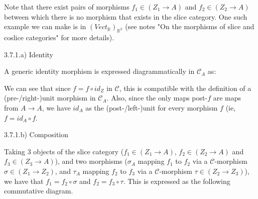 \documentclass[12pt, letterpaper, twoside]{report}
\begin{document}
Note that there exist pairs of morphisms $f_1 \in (Z_1 \to A)$ and $f_2 \in (Z_2 \to A)$ between which there is no morphism that exists in the slice category. One such example we can make is in $(Vect_\mathbb{R})_{\mathbb{R}^2}$ (see notes "On the morphisms of slice and coslice categories" for more details).

3.7.1.a) Identity

A generic identity morphism is expressed diagrammatically in $\mathcal{C}_A$ as:


We can see that since $f = f \circ id_Z$ in $\mathcal{C}$, this is compatible with the definition of a (pre-/right-)unit morphism in $\mathcal{C}_A$. Also, since the only maps post-$f$ are maps from $A \to A$, we have $id_A$ as the (post-/left-)unit for every morphism $f$ (ie, $f = id_A \circ f$. 

3.7.1.b) Composition

Taking 3 objects of the slice category ($f_1 \in (Z_1 \to A)$, $f_2 \in (Z_2 \to A)$ and $f_3 \in (Z_3 \to A)$), and two morphisms ($\sigma_A$ mapping $f_1$ to $f_2$ via a $\mathcal{C}$-morphism $\sigma \in (Z_1 \to Z_2)$, and $\tau_A$ mapping $f_2$ to $f_3$ via a $\mathcal{C}$-morphism $\tau \in (Z_2 \to Z_3)$), we have that $f_1 = f_2 \circ \sigma$ and $f_2 = f_3 \circ \tau$. This is expressed as the following commutative diagram.

\end{document}
